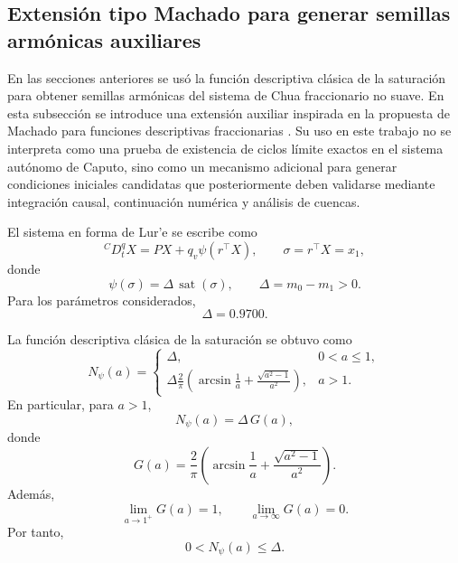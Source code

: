 \subsection{Extensión tipo Machado para generar semillas armónicas auxiliares}
\label{subsec:machado_seed_chua_ns}

En las secciones anteriores se usó la función descriptiva clásica de la
saturación para obtener semillas armónicas del sistema de Chua fraccionario no
suave. En esta subsección se introduce una extensión auxiliar inspirada en la
propuesta de Machado para funciones descriptivas fraccionarias
\cite{TenreiroMachado2015}. Su uso en este trabajo no se interpreta como una
prueba de existencia de ciclos límite exactos en el sistema autónomo de Caputo,
sino como un mecanismo adicional para generar condiciones iniciales candidatas
que posteriormente deben validarse mediante integración causal, continuación
numérica y análisis de cuencas.

El sistema en forma de Lur'e se escribe como
\begin{equation}
\label{eq:lure_ns_machado}
{}^{C}D_t^qX
=
PX+q_v\psi(r^\top X),
\qquad
\sigma=r^\top X=x_1,
\end{equation}
donde
\begin{equation}
\label{eq:psi_ns_machado}
\psi(\sigma)
=
\Delta\,\operatorname{sat}(\sigma),
\qquad
\Delta=m_0-m_1>0.
\end{equation}
Para los parámetros considerados,
\begin{equation}
\Delta=0.9700.
\end{equation}

La función descriptiva clásica de la saturación se obtuvo como
\begin{equation}
\label{eq:Npsi_classic_machado}
N_\psi(a)
=
\begin{cases}
\Delta, & 0<a\leq 1,\\[2mm]
\displaystyle
\Delta\frac{2}{\pi}
\left(
\arcsin\frac1a+
\frac{\sqrt{a^2-1}}{a^2}
\right),
& a>1.
\end{cases}
\end{equation}
En particular, para \(a>1\),
\begin{equation}
\label{eq:Npsi_large_machado}
N_\psi(a)
=
\Delta\,G(a),
\end{equation}
donde
\begin{equation}
\label{eq:Gamp_machado}
G(a)
=
\frac{2}{\pi}
\left(
\arcsin\frac1a+
\frac{\sqrt{a^2-1}}{a^2}
\right).
\end{equation}
Además,
\begin{equation}
\label{eq:G_limits_machado}
\lim_{a\to 1^+}G(a)=1,
\qquad
\lim_{a\to\infty}G(a)=0.
\end{equation}
Por tanto,
\begin{equation}
\label{eq:Npsi_range_machado}
0<N_\psi(a)\leq \Delta.
\end{equation}

